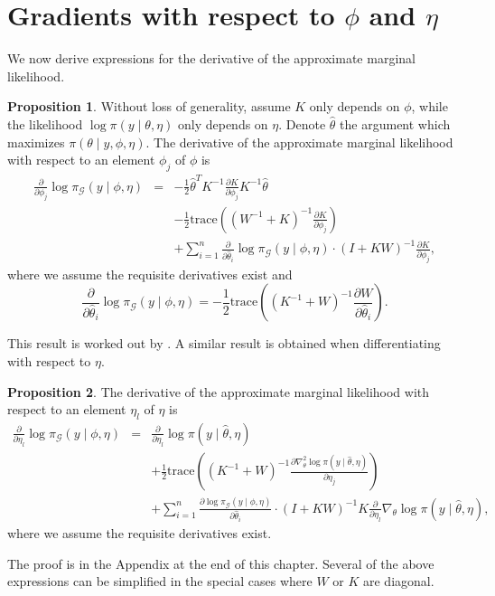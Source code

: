 \documentclass[stslayout, noinfoline]{imsart}
\theoremstyle{definition}
\newtheorem{proposition}{Proposition}
\begin{document}
\section{Gradients with respect to $\phi$ and $\eta$}

We now derive expressions for the derivative of the approximate marginal likelihood.

\begin{proposition} \label{lemma:diff-phi}
 Without loss of generality, assume $K$ only depends on $\phi$, while the likelihood $\log \pi(y \mid \theta, \eta)$ only depends on $\eta$.
 Denote $\hat \theta$ the argument which maximizes $\pi(\theta \mid y, \phi, \eta)$.
 The derivative of the approximate marginal likelihood with respect to an element $\phi_j$ of $\phi$ is
 \begin{eqnarray}
   \frac{\partial}{\partial \phi_j} \log \pi_\mathcal{G}(y \mid \phi, \eta) & = & - \frac{1}{2} \hat \theta^T K^{-1} \frac{\partial K}{\partial \phi_j} K^{-1} \hat \theta \nonumber  \\
   & & - \frac{1}{2} \mathrm{trace} \left ( (W^{-1} + K)^{-1} \frac{\partial K}{\partial \phi_j} \right) \nonumber \\
   & & + \sum_{i = 1}^n \frac{\partial}{\partial \hat \theta_i} \log \pi_\mathcal{G} (y \mid \phi, \eta) \cdot (I + KW)^{-1} \frac{\partial K}{\partial \phi_j},
 \end{eqnarray}
 where we assume the requisite derivatives exist and
 \begin{equation}
  \frac{\partial}{\partial \hat \theta_i}  \log \pi_\mathcal{G}(y \mid \phi, \eta) = - \frac{1}{2} \mathrm{trace} \left ((K^{-1} + W)^{-1} \frac{\partial W}{\partial \hat \theta_i} \right).
\end{equation}
\end{proposition}
This result is worked out by \citet[Section 5.5.1]{Rasmussen:2006}.
A similar result is obtained when differentiating with respect to $\eta$.

\begin{proposition} \label{lemma:diff-eta}
  The derivative of the approximate marginal likelihood with respect to an element $\eta_l$ of $\eta$ is
  \begin{eqnarray} \label{eq:gradient-eta}
  \frac{\partial}{\partial \eta_l}\log \pi_\mathcal{G} (y \mid \phi, \eta) & = &  \frac{\partial }{\partial \eta_l} \log \pi(y \mid \hat \theta, \eta) \nonumber \\
  & & + \frac{1}{2} \mathrm{trace} \left ((K^{-1} + W)^{-1} \frac{\partial \nabla^2_\theta \log \pi(y \mid \hat \theta, \eta)}{\partial \eta_j} \right) \nonumber \\
 & & + \sum_{i = 1}^n \frac{\partial \log \pi_\mathcal{G} (y \mid \phi, \eta)}{\partial \hat \theta_i} \cdot (I + KW)^{-1} K \frac{\partial}{\partial \eta_l} \nabla_\theta \log \pi(y \mid \hat \theta, \eta),
\end{eqnarray}
where we assume the requisite derivatives exist.
\end{proposition}
%
The proof is in the Appendix at the end of this chapter.
Several of the above expressions can be simplified in the special cases where $W$ or $K$ are diagonal.
\end{document}
